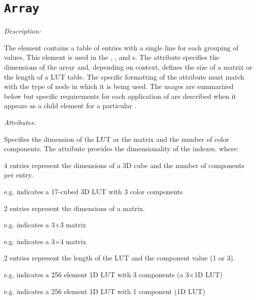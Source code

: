\section{\texttt{Array}} \label{sec:array}
\emph{Description:} \par
The  element contains a table of entries with a single line for each grouping of values. This element is used in the , , and  s. The  attribute specifies the dimensions of the array and, depending on context, defines the size of a matrix or the length of a LUT table. The specific formatting of the  attribute must match with the type of node in which it is being used. The usages are summarized below but specific requirements for each application of  are described when it appears as a child element for a particular .

\emph{Attributes:}
\begin{xmlfields}
	\xmlitem[dim][required] 	Specifies the dimension of the LUT or the matrix and the number of color components. The  attribute provides the dimensionality of the indexes, where:

		4 entries represent the dimensions of a 3D cube and the number of components per entry.
		\begin{list}{}{\setlength{\itemsep}{4pt}\setlength{\topsep}{0pt}}
				\item e.g.  indicates a 17-cubed 3D LUT with 3 color components
		\end{list}

		2 entries represent the dimensions of a matrix.
		\begin{list}{}{\setlength{\itemsep}{4pt}\setlength{\topsep}{0pt}}
				\item e.g.  indicates a 3$\times$3 matrix
				\item e.g.  indicates a 3$\times$4 matrix
		\end{list}

		2 entries represent the length of the LUT and the component value (1 or 3).
		\begin{list}{}{\setlength{\itemsep}{4pt}\setlength{\topsep}{0pt}}
				\item e.g.  indicates a 256 element 1D LUT with 3 components (a 3$\times$1D LUT)
				\item e.g.  indicates a 256 element 1D LUT with 1 component (1D LUT)
		\end{list}
\end{xmlfields}